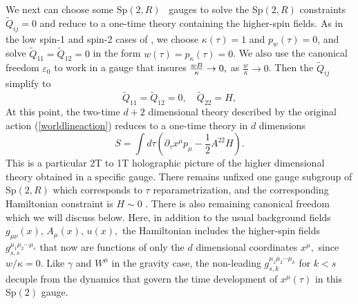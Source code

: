 \documentclass[a4paper,12pt]{article}
\begin{document}
We next can choose some Sp$(2,R)$ \ gauges to solve the Sp$\left( 2,R\right)
$ constraints $\tilde{Q}_{ij}=0$ and reduce to a one-time theory containing
the higher-spin fields. As in the low spin-1 and spin-2 cases of \cite
{emgrav}, we choose $\kappa \left( \tau \right) =1$ and $p_{w}\left( \tau
\right) =0$, and solve $\tilde{Q}_{11}=\tilde{Q}_{12}=0$ in the form $%
w\left( \tau \right) =p_{\kappa }\left( \tau \right) =0$. We also use the
canonical freedom $\varepsilon _{0}$ to work in a gauge that insures $\frac{%
wB}{\kappa }\rightarrow 0,$ as $\frac{w}{\kappa }\rightarrow 0$. Then the $%
\tilde{Q}_{ij}$ simplify to
\begin{equation}
\tilde{Q}_{11}=\tilde{Q}_{12}=0,\quad \tilde{Q}_{22}=H,
\end{equation}
At this point, the two-time $d+2$ dimensional theory described by the
original action (\ref{worldlineaction}) reduces to a one-time theory in $d$
dimensions
\begin{equation}
S=\int d\tau \left( \partial _{\tau }x^{\mu }p_{\mu }-\frac{1}{2}%
A^{22}H\right) .  \label{actiond}
\end{equation}
This is a particular 2T to 1T holographic picture of the higher dimensional
theory obtained in a specific gauge. There remains unfixed one gauge
subgroup of Sp$\left( 2,R\right) $ which corresponds to $\tau $
reparametrization, and the corresponding Hamiltonian constraint is $H\sim 0$%
. There is also remaining canonical freedom which we will discuss below.
Here, in addition to the usual background fields $g_{\mu \nu }\left(
x\right) $, $A_{\mu }\left( x\right) $, $u\left( x\right) ,$ the Hamiltonian
includes the higher-spin fields $g_{s,s}^{\mu _{1}\mu _{2}\cdots \mu _{s}}$
that now are functions of only the $d$ dimensional coordinates $x^{\mu },$
since $w/\kappa =0$. Like $\gamma $ and $W^{\mu }$ in the gravity case, the
non-leading $g_{s,k}^{\mu _{1}\mu _{2}\cdots \mu _{k}}$ for $k<s$ decuple
from the dynamics that govern the time development of $x^{\mu }(\tau )$ in
this Sp$\left( 2\right) $ gauge.
\end{document}
